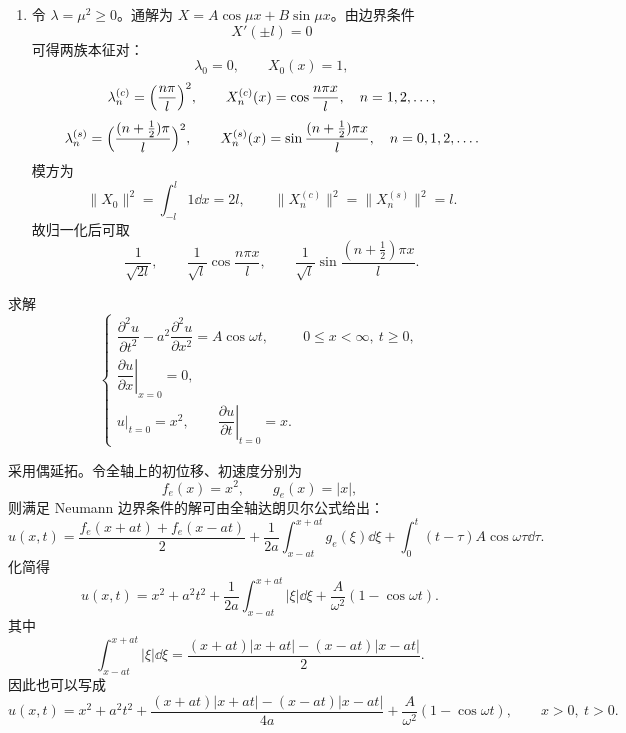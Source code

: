 \begin{question}[简单计算和回答]
\begin{solution}
\begin{enumerate}[label=(\arabic*),leftmargin=2.6em,itemsep=0.25em,topsep=0.2em]
\item 令 $\lambda=\mu^2\ge 0$。通解为 $X=A\cos \mu x+B\sin \mu x$。由边界条件
\[
X'(\pm l)=0
\]
可得两族本征对：
\[
\lambda_0=0,\qquad X_0(x)=1,
\]
\[
\lambda_n^{(c)}=\Bigl(\frac{n\pi}{l}\Bigr)^2,\qquad X_n^{(c)}(x)=\cos\frac{n\pi x}{l},\quad n=1,2,\dots,
\]
\[
\lambda_n^{(s)}=\Bigl(\frac{(n+\tfrac12)\pi}{l}\Bigr)^2,
\qquad X_n^{(s)}(x)=\sin\frac{(n+\tfrac12)\pi x}{l},\quad n=0,1,2,\dots.
\]
模方为
\[
\|X_0\|^2=\int_{-l}^{l}1\dd{x}=2l,
\qquad
\|X_n^{(c)}\|^2=\|X_n^{(s)}\|^2=l.
\]
故归一化后可取
\[
\frac{1}{\sqrt{2l}},\qquad \frac{1}{\sqrt l}\cos\frac{n\pi x}{l},
\qquad \frac{1}{\sqrt l}\sin\frac{(n+\tfrac12)\pi x}{l}.
\]
\end{enumerate}


\end{solution}
\end{question}

\begin{question}[一维弦受迫振动的半无界定解问题]

求解
\[
\begin{cases}
\dfrac{\partial^2u}{\partial t^2}-a^2\dfrac{\partial^2u}{\partial x^2}=A\cos\omega t,
&0\le x<\infty,\ t\ge 0,\\
\left.\dfrac{\partial u}{\partial x}\right|_{x=0}=0,\\
u|_{t=0}=x^2,\qquad \left.\dfrac{\partial u}{\partial t}\right|_{t=0}=x.
\end{cases}
\]

\begin{solution}

采用偶延拓。令全轴上的初位移、初速度分别为
\[
f_e(x)=x^2,\qquad g_e(x)=|x|,
\]
则满足 Neumann 边界条件的解可由全轴达朗贝尔公式给出：
\[
  u(x,t)=\frac{f_e(x+at)+f_e(x-at)}{2}+\frac{1}{2a}\int_{x-at}^{x+at}g_e(\xi)\dd{\xi}
 +\int_0^t (t-\tau)A\cos\omega\tau\dd{\tau}.
\]
化简得
\[
  u(x,t)=x^2+a^2t^2+\frac{1}{2a}\int_{x-at}^{x+at}|\xi|\dd{\xi}+\frac{A}{\omega^2}(1-\cos\omega t).
\]
其中
\[
\int_{x-at}^{x+at}|\xi|\dd{\xi}
=\frac{(x+at)|x+at|-(x-at)|x-at|}{2}.
\]
因此也可以写成
\[
 u(x,t)=x^2+a^2t^2+
 \frac{(x+at)|x+at|-(x-at)|x-at|}{4a}
 +\frac{A}{\omega^2}(1-\cos\omega t),\qquad x>0,\ t>0.
\]


\end{solution}
\end{question}

